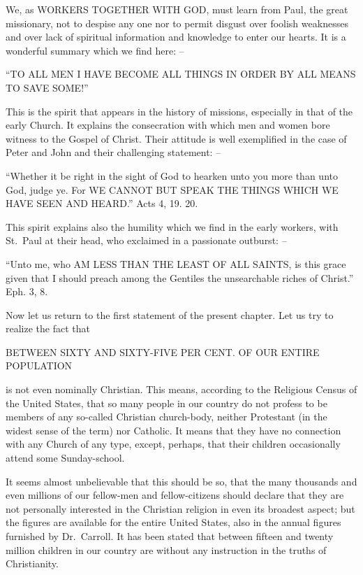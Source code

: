 \documentclass[
]{book}
\begin{document}
We, as WORKERS TOGETHER WITH GOD, must learn from Paul, the great missionary, not to despise any one nor to permit disgust over foolish weaknesses and over lack of spiritual information and knowledge to enter our hearts. It is a wonderful summary which we find here: --

``TO ALL MEN I HAVE BECOME ALL THINGS IN ORDER BY ALL MEANS TO SAVE SOME!''

This is the spirit that appears in the history of missions, especially in that of the early Church. It explains the consecration with which men and women bore witness to the Gospel of Christ. Their attitude is well exemplified in the case of Peter and John and their challenging statement: --

``Whether it be right in the sight of God to hearken unto you more than unto God, judge ye. For WE CANNOT BUT SPEAK THE THINGS WHICH WE HAVE SEEN AND HEARD.'' Acts 4, 19. 20.

This spirit explains also the humility which we find in the early workers, with St.~Paul at their head, who exclaimed in a passionate outburst: --

``Unto me, who AM LESS THAN THE LEAST OF ALL SAINTS, is this grace given that I should preach among the Gentiles the unsearchable riches of Christ.'' Eph. 3, 8.

Now let us return to the first statement of the present chapter. Let us try to realize the fact that

\begin{center} BETWEEN SIXTY AND SIXTY-FIVE PER CENT. OF OUR ENTIRE POPULATION \end{center}

is not even nominally Christian. This means, according to the Religious Census of the United States, that so many people in our country do not profess to be members of any so-called Christian church-body, neither Protestant (in the widest sense of the term) nor Catholic. It means that they have no connection with any Church of any type, except, perhaps, that their children occasionally attend some Sunday-school.

It seems almost unbelievable that this should be so, that the many thousands and even millions of our fellow-men and fellow-citizens should declare that they are not personally interested in the Christian religion in even its broadest aspect; but the figures are available for the entire United States, also in the annual figures furnished by Dr.~Carroll. It has been stated that between fifteen and twenty million children in our country are without any instruction in the truths of Christianity.
\end{document}
